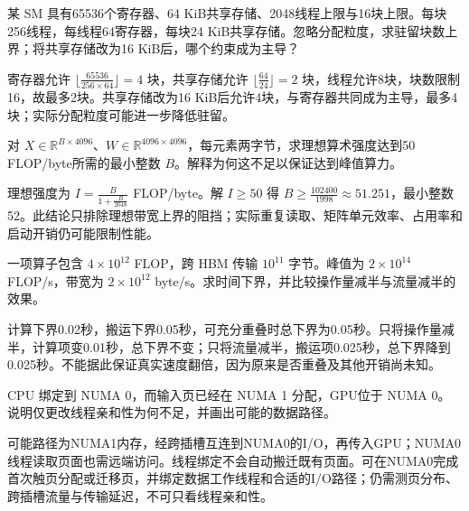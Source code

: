 
\begin{exercises}
\begin{exercise}\optional 某 SM 具有65536个寄存器、64 KiB共享存储、2048线程上限与16块上限。每块256线程，每线程64寄存器，每块24 KiB共享存储。忽略分配粒度，求驻留块数上界；将共享存储改为16 KiB后，哪个约束成为主导？

\begin{solution}
寄存器允许 $\lfloor\frac{65536}{256\times64}\rfloor=4$ 块，共享存储允许 $\lfloor\frac{64}{24}\rfloor=2$ 块，线程允许8块，块数限制16，故最多2块。共享存储改为16 KiB后允许4块，与寄存器共同成为主导，最多4块；实际分配粒度可能进一步降低驻留。
\end{solution}
\end{exercise}

\begin{exercise} 对 $X\in\mathbb R^{B\times4096}$、$W\in\mathbb R^{4096\times4096}$，每元素两字节，求理想算术强度达到50 FLOP/byte所需的最小整数 $B$。解释为何这不足以保证达到峰值算力。

\begin{solution}
理想强度为 $I=\frac{B}{1+\frac{B}{2048}}$ FLOP/byte。解 $I\ge50$ 得 $B\ge\frac{102400}{1998}\approx51.251$，最小整数52。此结论只排除理想带宽上界的阻挡；实际重复读取、矩阵单元效率、占用率和启动开销仍可能限制性能。
\end{solution}
\end{exercise}

\begin{exercise} 一项算子包含 $4\times10^{12}$ FLOP，跨 HBM 传输 $10^{11}$ 字节。峰值为 $2\times10^{14}$ FLOP/s，带宽为 $2\times10^{12}$ byte/s。求时间下界，并比较操作量减半与流量减半的效果。

\begin{solution}
计算下界0.02秒，搬运下界0.05秒，可充分重叠时总下界为0.05秒。只将操作量减半，计算项变0.01秒，总下界不变；只将流量减半，搬运项0.025秒，总下界降到0.025秒。不能据此保证真实速度翻倍，因为原来是否重叠及其他开销尚未知。
\end{solution}
\end{exercise}

\begin{exercise} CPU 绑定到 NUMA 0，而输入页已经在 NUMA 1 分配，GPU位于 NUMA 0。说明仅更改线程亲和性为何不足，并画出可能的数据路径。

\begin{solution}
可能路径为NUMA1内存，经跨插槽互连到NUMA0的I/O，再传入GPU；NUMA0线程读取页面也需远端访问。线程绑定不会自动搬迁既有页面。可在NUMA0完成首次触页分配或迁移页，并绑定数据工作线程和合适的I/O路径；仍需测页分布、跨插槽流量与传输延迟，不可只看线程亲和性。
\end{solution}
\end{exercise}


\end{exercises}
